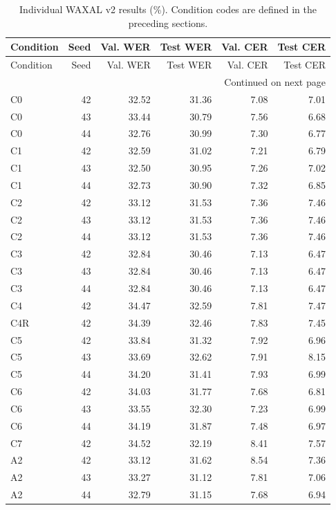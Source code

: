 \documentclass[12pt,a4paper]{report}
\begin{document}
\small
\begin{longtable}{lrrrrr}
\caption{Individual WAXAL v2 results (\%). Condition codes are defined in the preceding sections.}\label{tab:results-perseed}\\
\toprule Condition & Seed & Val. WER & Test WER & Val. CER & Test CER\\\midrule
\endfirsthead
\toprule Condition & Seed & Val. WER & Test WER & Val. CER & Test CER\\\midrule
\endhead
\midrule\multicolumn{6}{r}{Continued on next page}\\\endfoot
\bottomrule\endlastfoot
C0 & 42 & 32.52 & 31.36 & 7.08 & 7.01 \\
C0 & 43 & 33.44 & 30.79 & 7.56 & 6.68 \\
C0 & 44 & 32.76 & 30.99 & 7.30 & 6.77 \\
C1 & 42 & 32.59 & 31.02 & 7.21 & 6.79 \\
C1 & 43 & 32.50 & 30.95 & 7.26 & 7.02 \\
C1 & 44 & 32.73 & 30.90 & 7.32 & 6.85 \\
C2 & 42 & 33.12 & 31.53 & 7.36 & 7.46 \\
C2 & 43 & 33.12 & 31.53 & 7.36 & 7.46 \\
C2 & 44 & 33.12 & 31.53 & 7.36 & 7.46 \\
C3 & 42 & 32.84 & 30.46 & 7.13 & 6.47 \\
C3 & 43 & 32.84 & 30.46 & 7.13 & 6.47 \\
C3 & 44 & 32.84 & 30.46 & 7.13 & 6.47 \\
C4 & 42 & 34.47 & 32.59 & 7.81 & 7.47 \\
C4R & 42 & 34.39 & 32.46 & 7.83 & 7.45 \\
C5 & 42 & 33.84 & 31.32 & 7.92 & 6.96 \\
C5 & 43 & 33.69 & 32.62 & 7.91 & 8.15 \\
C5 & 44 & 34.20 & 31.41 & 7.93 & 6.99 \\
C6 & 42 & 34.03 & 31.77 & 7.68 & 6.81 \\
C6 & 43 & 33.55 & 32.30 & 7.23 & 6.99 \\
C6 & 44 & 34.19 & 31.87 & 7.48 & 6.97 \\
C7 & 42 & 34.52 & 32.19 & 8.41 & 7.57 \\
A2 & 42 & 33.12 & 31.62 & 8.54 & 7.36 \\
A2 & 43 & 33.27 & 31.12 & 7.81 & 7.06 \\
A2 & 44 & 32.79 & 31.15 & 7.68 & 6.94 \\

\end{longtable}
\end{document}
